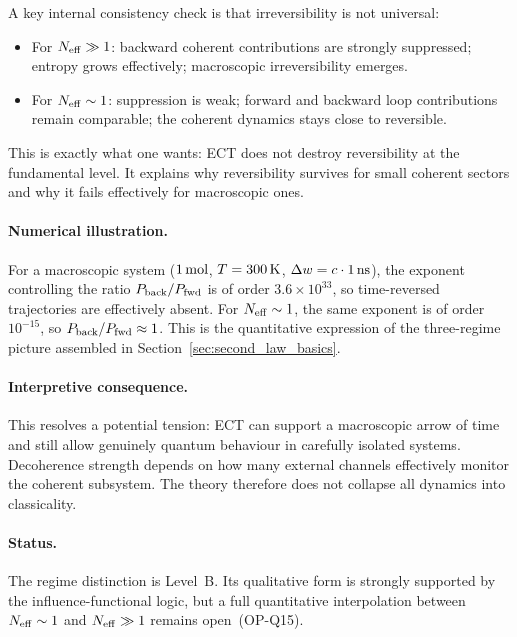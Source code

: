 \documentclass[11pt,a4paper]{article}
\numberwithin{equation}{section}
\begin{document}
A key internal consistency check is that irreversibility is not
universal:
\begin{itemize}
  \item For $N_{\rm eff}\gg 1$: backward coherent contributions are
    strongly suppressed; entropy grows effectively; macroscopic
    irreversibility emerges.
  \item For $N_{\rm eff}\sim 1$: suppression is weak; forward and
    backward loop contributions remain comparable; the coherent
    dynamics stays close to reversible.
\end{itemize}
This is exactly what one wants: ECT does not destroy reversibility at
the fundamental level.
It explains why reversibility survives for small coherent sectors and
why it fails effectively for macroscopic ones.

\paragraph{Numerical illustration.}
For a macroscopic system ($1\,{\rm mol}$, $T=300\,{\rm K}$,
$\Delta w=c\cdot1\,{\rm ns}$), the exponent controlling the ratio
$P_{\rm back}/P_{\rm fwd}$ is of order $3.6\times10^{33}$,
so time-reversed trajectories are effectively absent.
For $N_{\rm eff}\sim1$, the same exponent is of order $10^{-15}$,
so $P_{\rm back}/P_{\rm fwd}\approx1$.
This is the quantitative expression of the three-regime picture
assembled in Section~\ref{sec:second_law_basics}.

\paragraph{Interpretive consequence.}
This resolves a potential tension: ECT can support a macroscopic arrow
of time and still allow genuinely quantum behaviour in carefully isolated
systems.
Decoherence strength depends on how many external channels effectively
monitor the coherent subsystem.
The theory therefore does not collapse all dynamics into classicality.

\paragraph{Status.}
The regime distinction is Level~B.
Its qualitative form is strongly supported by the influence-functional
logic, but a full quantitative interpolation between $N_{\rm eff}\sim1$
and $N_{\rm eff}\gg1$ remains open~(OP-Q15).
\end{document}
